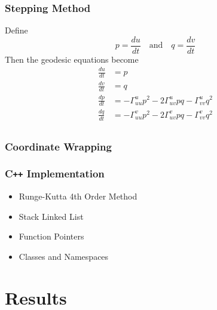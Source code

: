 \documentclass{beamer}
\begin{document}
\begin{frame}

\frametitle{Stepping Method}

	Define
	\begin{equation*}
		p = \frac{du}{dt} \quad\text{and}\quad q = \frac{dv}{dt}
	\end{equation*}
	Then the geodesic equations become
	\begin{align*}
		\frac{du}{dt} & = p \\
		\frac{dv}{dt} & = q \\
		\frac{dp}{dt} & = -\Gamma^u_{uu}p^2-2\Gamma^u_{uv}pq-\Gamma^u_{vv}q^2 \\
		\frac{dq}{dt} & = -\Gamma^v_{uu}p^2-2\Gamma^v_{uv}pq-\Gamma^v_{vv}q^2 \\
	\end{align*}

\end{frame}


\begin{frame}

	\frametitle{Coordinate Wrapping}
	
	\begin{figure}
		
	\end{figure}

\end{frame}



\begin{frame}
	
	\frametitle{C\texttt{++} Implementation}
	
	\begin{itemize}
		\item Runge-Kutta 4th Order Method
		\item Stack Linked List
		\item Function Pointers
		\item Classes and Namespaces
	\end{itemize}
	
\end{frame}

\section{Results}
\end{document}

